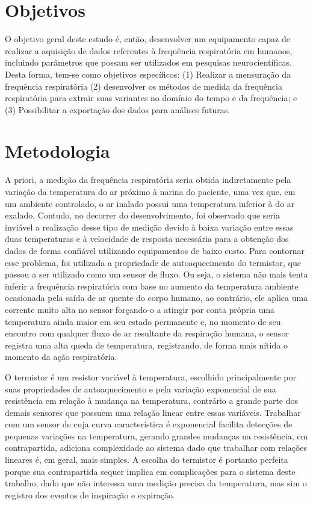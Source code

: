  
 
 
 
  
  \section{Objetivos}
  
	O objetivo geral deste estudo é, então, desenvolver um equipamento capaz de realizar a aquisição de dados referentes à frequência respiratória em humanos, incluindo parâmetros que possam ser utilizados em pesquisas neurocientíficas. Desta forma, tem-se como objetivos específicos: (1) Realizar a mensuração da frequência respiratória (2) desenvolver os métodos de medida da frequência respiratória para extrair suas variantes no domínio do tempo e da frequência; e (3) Possibilitar a exportação dos dados para análises futuras.
  
  
  \section{Metodologia}

	A priori, a medição da frequência respiratória seria obtida indiretamente pela variação da temperatura do ar próximo à narina do paciente, uma vez que, em um ambiente controlado, o ar inalado possui uma temperatura inferior à do ar exalado. Contudo, no decorrer do desenvolvimento, foi observado que seria inviável a realização desse tipo de medição devido à baixa variação entre essas duas temperaturas e à velocidade de resposta necessária para a obtenção dos dados de forma confiável utilizando equipamentos de baixo custo. Para contornar esse problema, foi utilizada a propriedade de autoaquecimento do termistor, que passou a ser utilizado como um sensor de fluxo. Ou seja, o sistema não mais tenta inferir a frequência respiratória com base no aumento da temperatura ambiente ocasionada pela saída de ar quente do corpo humano, ao contrário, ele aplica uma corrente muito alta no sensor forçando-o a atingir por conta própria uma temperatura ainda maior em seu estado permanente e, no momento de seu encontro com qualquer fluxo de ar resultante da respiração humana, o sensor registra uma alta queda de temperatura, registrando, de forma mais nítida o momento da ação respiratória.

	O termistor é um resistor variável à temperatura, escolhido principalmente por suas propriedades de autoaquecimento e pela variação exponencial de sua resistência em relação à mudança na temperatura, contrário a grande parte dos demais sensores que possuem uma relação linear entre essas variáveis. Trabalhar com um sensor de cuja curva característica é exponencial facilita detecções de pequenas variações na temperatura, gerando grandes mudanças na resistência, em contrapartida, adiciona complexidade ao sistema dado que trabalhar com relações lineares é, em geral, mais simples. A escolha do termistor é portanto perfeita porque sua contrapartida sequer implica em complicações para o sistema deste trabalho, dado que não interessa uma medição precisa da temperatura, mas sim o registro dos eventos de inspiração e expiração.
	
